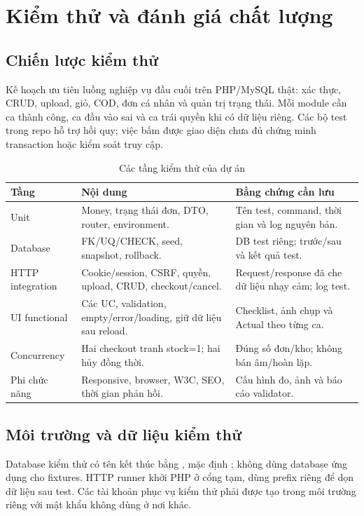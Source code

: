 \section{Kiểm thử và đánh giá chất lượng}
\label{sec:testing}
\subsection{Chiến lược kiểm thử}
Kế hoạch ưu tiên luồng nghiệp vụ đầu cuối trên PHP/MySQL thật: xác thực, CRUD, upload, giỏ, COD, đơn cá nhân và quản trị trạng thái. Mỗi module cần ca thành công, ca đầu vào sai và ca trái quyền khi có dữ liệu riêng. Các bộ test trong repo hỗ trợ hồi quy; việc bấm được giao diện chưa đủ chứng minh transaction hoặc kiểm soát truy cập.

\begin{table}[H]\centering
\caption{Các tầng kiểm thử của dự án}\label{tab:test-levels}
\begin{tabularx}{\linewidth}{@{}P{2.5cm}YY@{}}\toprule
Tầng & Nội dung & Bằng chứng cần lưu\\\midrule
Unit & Money, trạng thái đơn, DTO, router, environment. & Tên test, command, thời gian và log nguyên bản.\\
Database & FK/UQ/CHECK, seed, snapshot, rollback. & DB test riêng; trước/sau và kết quả test.\\
HTTP integration & Cookie/session, CSRF, quyền, upload, CRUD, checkout/cancel. & Request/response đã che dữ liệu nhạy cảm; log test.\\
UI functional & Các UC, validation, empty/error/loading, giữ dữ liệu sau reload. & Checklist, ảnh chụp và Actual theo từng ca.\\
Concurrency & Hai checkout tranh stock=1; hai hủy đồng thời. & Đúng số đơn/kho; không bán âm/hoàn lặp.\\
Phi chức năng & Responsive, browser, W3C, SEO, thời gian phản hồi. & Cấu hình đo, ảnh và báo cáo validator.\\
\bottomrule\end{tabularx}
\end{table}

\subsection{Môi trường và dữ liệu kiểm thử}
Database kiểm thử có tên kết thúc bằng , mặc định ; không dùng database ứng dụng cho fixtures. HTTP runner khởi PHP ở cổng tạm, dùng prefix riêng để dọn dữ liệu sau test. Các tài khoản phục vụ kiểm thử phải được tạo trong môi trường riêng với mật khẩu không dùng ở nơi khác.

